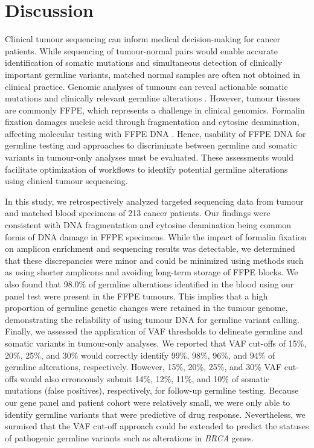 
\chapter{Discussion}
\label{ch:Discussion}

Clinical tumour sequencing can inform medical decision-making for cancer patients. While sequencing of tumour-normal pairs would enable accurate identification of somatic mutations and simultaneous detection of clinically important germline variants, matched normal samples are often not obtained in clinical practice. Genomic analyses of tumours can reveal actionable somatic mutations and clinically relevant germline alterations \cite{Meric-Bernstam2016, Schrader2015, Jones2015a}. However, tumour tissues are commonly FFPE, which represents a challenge in clinical genomics. Formalin fixation damages nucleic acid through fragmentation and cytosine deamination, affecting molecular testing with FFPE DNA \cite{Do2015a, Kim2017, Ofner2017, Oh2015, Wong2013, Wong2014, Sikorsky2007}. Hence, usability of FFPE DNA for germline testing and approaches to discriminate between germline and somatic variants in tumour-only analyses must be evaluated. These assessments would facilitate optimization of workflows to identify potential germline alterations using clinical tumour sequencing.

In this study, we retrospectively analyzed targeted sequencing data from tumour and matched blood specimens of 213 cancer patients. Our findings were consistent with DNA fragmentation and cytosine deamination being common forms of DNA damage in FFPE specimens. While the impact of formalin fixation on amplicon enrichment and sequencing results was detectable, we determined that these discrepancies were minor and could be minimized using methods such as using shorter amplicons and avoiding long-term storage of FFPE blocks. We also found that 98.0\% of germline alterations identified in the blood using our panel test were present in the FFPE tumours. This implies that a high proportion of germline genetic changes were retained in the tumour genome, demonstrating the reliability of using tumour DNA for germline variant calling. Finally, we assessed the application of VAF thresholds to delineate germline and somatic variants in tumour-only analyses. We reported that VAF cut-offs of 15\%, 20\%, 25\%, and 30\% would correctly identify 99\%, 98\%, 96\%, and 94\% of germline alterations, respectively. However, 15\%, 20\%, 25\%, and 30\% VAF cut-offs would also erroneously submit 14\%, 12\%, 11\%, and 10\% of somatic mutations (false positives), respectively, for follow-up germline testing. Because our gene panel and patient cohort were relatively small, we were only able to identify germline variants that were predictive of drug response. Nevertheless, we surmised that the VAF cut-off approach could be extended to predict the statuses of pathogenic germline variants such as alterations in \textit{BRCA} genes.

